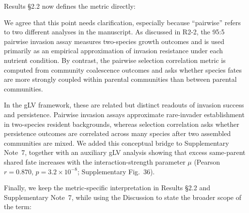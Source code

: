 Results \S2.2 now defines the metric directly: 


\responselabel
We agree that this point needs clarification, especially because ``pairwise'' refers to two different analyses in the manuscript. As discussed in R2-2, the 95:5 pairwise invasion assay measures two-species growth outcomes and is used primarily as an empirical approximation of invasion resistance under each nutrient condition. By contrast, the pairwise selection correlation metric is computed from community coalescence outcomes and asks whether species fates are more strongly coupled within parental communities than between parental communities.

In the gLV framework, these are related but distinct readouts of invasion success and persistence. Pairwise invasion assays approximate rare-invader establishment in two-species resident backgrounds, whereas selection correlation asks whether persistence outcomes are correlated across many species after two assembled communities are mixed. We added this conceptual bridge to Supplementary Note~7, together with an auxiliary gLV analysis showing that excess same-parent shared fate increases with the interaction-strength parameter $\mu$ (Pearson $r = 0.870$, $p = 3.2 \times 10^{-8}$; Supplementary Fig.~36).

Finally, we keep the metric-specific interpretation in Results \S2.2 and Supplementary Note~7, while using the Discussion to state the broader scope of the term: 

